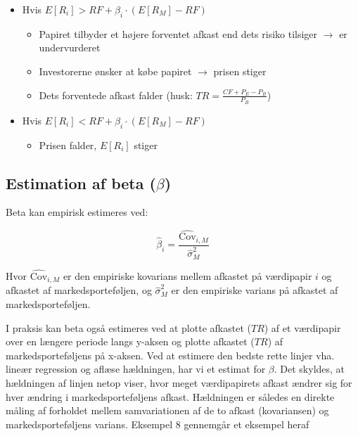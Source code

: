 \documentclass[10pt,reqno, usenames]{article}
\begin{document}
\begin{itemize}
    \item Hvis \( E[R_i] > RF + \beta_i \cdot (E[R_M] - RF) \)
    \begin{itemize}
        \item Papiret tilbyder et højere forventet afkast end dets risiko tilsiger $\rightarrow$ er undervurderet
        \item Investorerne ønsker at købe papiret $\rightarrow$ prisen stiger
        \item Dets forventede afkast falder (husk: \( TR = \frac{CF + P_E - P_B}{P_B} \))
    \end{itemize}
    \item Hvis \( E[R_i] < RF + \beta_i \cdot (E[R_M] - RF) \)
    \begin{itemize}
        \item Prisen falder, \( E[R_i] \) stiger
    \end{itemize}
\end{itemize}

\subsection{Estimation af beta ($\beta$)}
Beta kan empirisk estimeres ved: 

\begin{equation}
            \hat{\beta}_i = \frac{\widehat{\text{Cov}}_{i,M}}{\widehat{\sigma}_M^2}
\end{equation}

Hvor $\widehat{\text{Cov}}_{i,M}$ er den empiriske kovarians mellem afkastet på værdipapir $i$ og afkastet af markedsporteføljen, og $\widehat{\sigma}_M^2$ er den empiriske varians på afkastet af markedsporteføljen. 

\vspace{10 pt}

I praksis kan beta også estimeres ved at plotte afkastet ($TR$) af et værdipapir over en længere periode langs y-aksen og plotte afkastet ($TR$) af markedsporteføljens på x-aksen. Ved at estimere den bedste rette linjer vha. lineær regression og aflæse hældningen, har vi et estimat for $\beta$. Det skyldes, at hældningen af linjen netop viser, hvor meget værdipapirets afkast ændrer sig for hver ændring i markedsporteføljens afkast. Hældningen er således en direkte måling af forholdet mellem samvariationen af de to afkast (kovariansen) og markedsporteføljens varians. Eksempel 8 gennemgår et eksempel heraf
\end{document}
